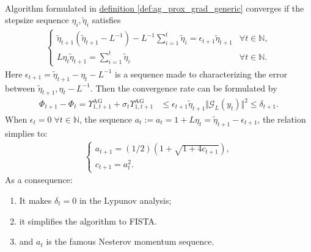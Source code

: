 \documentclass[12pt]{article}
\begin{document}
    \begin{theorem}
        \label{thm:ag_generic_stepsize_constrants}
        \;\\
        Algorithm formulated in 
        \hyperref[def:ag_prox_grad_generic]{definition \ref*{def:ag_prox_grad_generic}}
        converges if the stepsize sequence $\eta_i, \tilde \eta_{i}$ satisfies
        \begin{align*}
            \begin{cases}
                \tilde \eta_{t + 1} (\tilde \eta_{t + 1} - L^{-1})
                - L^{-1} \sum_{i= 1}^{t}\tilde \eta_i 
                = 
                \epsilon_{t + 1} \tilde \eta_{t + 1}
                & \forall t \in \mathbb N, 
                \\
                L \eta_t \tilde \eta_{t + 1} = \sum_{i=1}^{t}\tilde \eta_i 
                & \forall t \in \mathbb N. 
            \end{cases}
        \end{align*}
        Here $\epsilon_{t + 1} = \tilde \eta_{t + 1} - \eta_t - L^{-1}$ is a sequence made to characterizing the error between $\tilde \eta_{t + 1}, \eta_t - L^{-1}$. 
        Then the convergence rate can be formulated by
        \begin{align*}
            \Phi_{t + 1} - \Phi_t =
            \Upsilon_{1, t + 1}^\text{AG} + 
            \sigma_t\Upsilon_{1, t + 1}^{\text{AG}} 
            &\le \epsilon_{t + 1}\tilde\eta_{t + 1} \Vert \mathcal G_L(y_t)\Vert^2 \le \delta_{t + 1}.
        \end{align*}
        When $\epsilon_t = 0 \;\forall t\in \mathbb N$, the sequence $a_t:= a_t = 1 + L \eta_t = \tilde \eta_{t + 1} - \epsilon_{t + 1}$, the relation simplies to: 
        \begin{align*}
            \begin{cases}
                a_{t + 1} = (1/2)\left(
                1 + \sqrt{1 + 4 c_{t + 1}}
                \right), 
                \\
                c_{t + 1} = a_t^2.     
            \end{cases}
        \end{align*}
        As a consequence: 
        \begin{enumerate}
            \item It makes $\delta_{t} = 0$ in the Lypunov analysis; 
            \item it simplifies the algorithm to FISTA. 
            \item and $a_t$ is the famous Nesterov momentum sequence. 
        \end{enumerate}
        
        
    \end{theorem}
\end{document}
